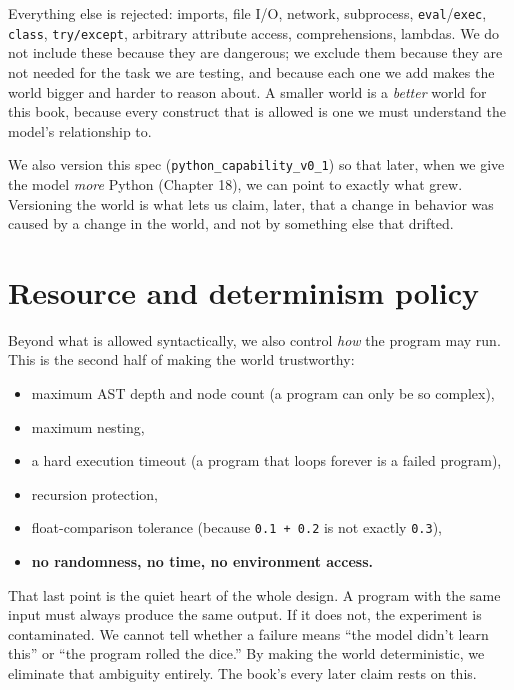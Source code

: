 Everything else is rejected: imports, file I/O, network, subprocess,
\texttt{eval}/\texttt{exec}, \texttt{class}, \texttt{try/except},
arbitrary attribute access, comprehensions, lambdas. We do not include
these because they are dangerous; we exclude them because they are not
needed for the task we are testing, and because each one we add makes
the world bigger and harder to reason about. A smaller world is a
\emph{better} world for this book, because every construct that is
allowed is one we must understand the model's relationship to.

We also version this spec (\texttt{python\_capability\_v0\_1}) so that
later, when we give the model \emph{more} Python (Chapter 18), we can
point to exactly what grew. Versioning the world is what lets us claim,
later, that a change in behavior was caused by a change in the world,
and not by something else that drifted.

\section{Resource and determinism
policy}\label{resource-and-determinism-policy}

Beyond what is allowed syntactically, we also control \emph{how} the
program may run. This is the second half of making the world
trustworthy:

\begin{itemize}
\tightlist
\item
  maximum AST depth and node count (a program can only be so complex),
\item
  maximum nesting,
\item
  a hard execution timeout (a program that loops forever is a failed
  program),
\item
  recursion protection,
\item
  float-comparison tolerance (because \texttt{0.1\ +\ 0.2} is not
  exactly \texttt{0.3}),
\item
  \textbf{no randomness, no time, no environment access.}
\end{itemize}

That last point is the quiet heart of the whole design. A program with
the same input must always produce the same output. If it does not, the
experiment is contaminated. We cannot tell whether a failure means ``the
model didn't learn this'' or ``the program rolled the dice.'' By making
the world deterministic, we eliminate that ambiguity entirely. The
book's every later claim rests on this.

